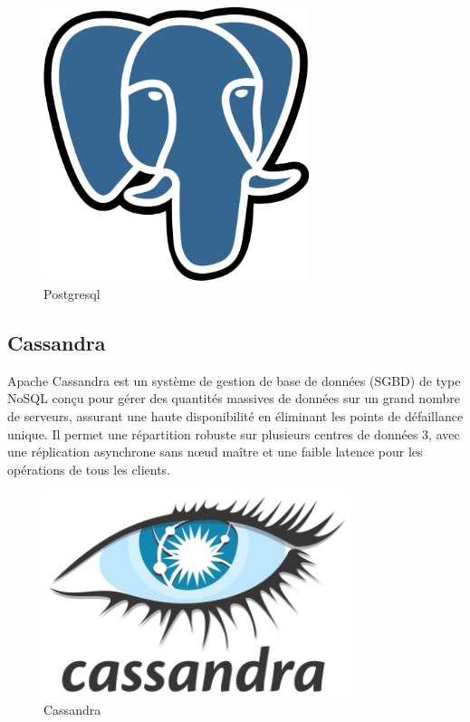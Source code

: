 \begin{figure}[!h]
\begin{center}
\includegraphics[height=8cm]{Postgresql.svg.png}
\end{center}
\caption{Postgresql}
\end{figure}



\subsection{Cassandra}

Apache Cassandra est un système de gestion de base de données (SGBD) de type NoSQL conçu pour gérer des quantités massives de données sur un grand nombre de serveurs, assurant une haute disponibilité en éliminant les points de défaillance unique. Il permet une répartition robuste sur plusieurs centres de données 3, avec une réplication asynchrone sans nœud maître et une faible latence pour les opérations de tous les clients.

\begin{figure}[!h]
\begin{center}
\includegraphics[height=6cm]{Cassandra.svg.png}
\end{center}
\caption{Cassandra}
\end{figure}


